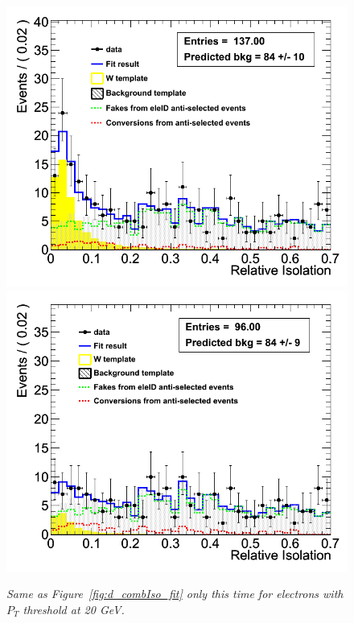 \begin{figure}[h!]
\centering
\includegraphics[scale=0.32]{Plots/d_combIso_pt20_fit.png}
\includegraphics[scale=0.32]{Plots/d_combIso_pt20_METanticut_fit.png}
\caption{\textit{Same as Figure~\ref{fig:d_combIso_fit} only this time for electrons with $P_{T}$ threshold at 20 GeV.  }}
\label{fig:d_combIso_fit_pt20}
\end{figure}

